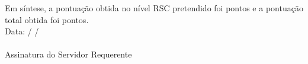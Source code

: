 Em síntese, a pontuação obtida no nível RSC pretendido foi \rsciiipontostotal \space pontos e a pontuação total obtida foi \rscpontostotal \space pontos.
\\
Data: \underline{\hspace{0.3in}} / \underline{\hspace{0.3in}} / \underline{\hspace{0.3in}}
\\
\underline{\hspace{5in}}\\
Assinatura do Servidor Requerente